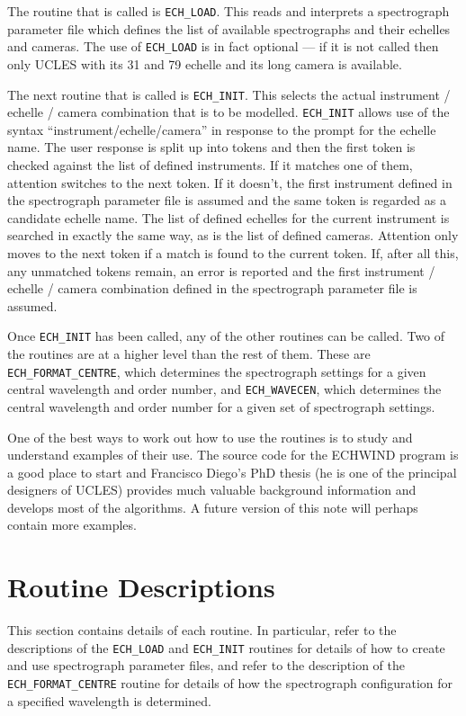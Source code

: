\documentclass[11pt,twoside,noabs,nolof]{starlink}
\begin{document}
The routine that is called is \texttt{ECH\_LOAD}. This reads and interprets a
spectrograph parameter file which defines the list of available spectrographs
and their echelles and cameras. The use of \texttt{ECH\_LOAD} is in fact optional
--- if it is not called then only UCLES with its 31 and 79 echelle and its long
camera is available.

The next routine that is called is \texttt{ECH\_INIT}. This selects the actual
instrument / echelle / camera combination that is to be modelled. \texttt{ECH\_INIT} allows use of the syntax ``instrument/echelle/camera'' in response
to the prompt for the echelle name. The user response is split up into tokens
and then the first token is checked against the list of defined instruments. If
it matches one of them, attention switches to the next token. If it doesn't,
the first instrument defined in the spectrograph parameter file is assumed and
the same token is regarded as a candidate echelle name. The list of defined
echelles for the current instrument is searched in exactly the same way, as is
the list of defined cameras. Attention only moves to the next token if a match
is found to the current token. If, after all this, any unmatched tokens remain,
an error is reported and the first instrument /  echelle / camera combination
defined in the spectrograph parameter file is assumed.

Once \texttt{ECH\_INIT} has been called, any of the other routines can be called.
Two of the routines are at a higher level than the rest of them. These are \texttt{ECH\_FORMAT\_CENTRE}, which determines the spectrograph settings for a given
central wavelength and order number, and \texttt{ECH\_WAVECEN}, which determines
the central wavelength and order number for a given set of spectrograph
settings.

One of the best ways to work out how to use the routines is to study and
understand examples of their use. The source code for the ECHWIND program is a
good place to start and Francisco Diego's PhD thesis (he is one of the
principal designers of UCLES) provides much valuable background information and
develops most of the algorithms. A future version of this note will perhaps
contain more examples.

\appendix
\section{Routine Descriptions}

This section contains details of each routine. In particular, refer to the
descriptions of the \texttt{ECH\_LOAD} and \texttt{ECH\_INIT} routines for details of
how to create and use spectrograph parameter files, and refer to the
description of the \texttt{ECH\_FORMAT\_CENTRE} routine for details of how the
spectrograph configuration for a specified wavelength is determined.
\end{document}
